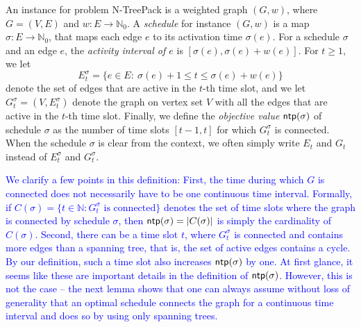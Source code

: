 \documentclass[runningheads]{llncs}
\newcommand{\NN}{\mathbb{N}}
\newcommand{\set}[1]{\{ #1 \}}
\newcommand{\xxxNTP}{{\sc N-TreePack}}
\DeclareMathOperator{\ntp}{\text{\sf ntp}}
\newcommand{\lasse}[1]{\textcolor{blue}{#1}}
\begin{document}
An instance for problem {\xxxNTP} is a weighted graph $(G,w)$, where $G=(V,E)$ and $w:E\to\NN_0$. 
A \emph{schedule} for instance $(G,w)$ is a map $\sigma:E\to\NN_0$, that maps each edge $e$ to 
its activation time $\sigma(e)$.
For a schedule $\sigma$ and an edge $e$, the \emph{activity interval of $e$} is $[\sigma(e),\sigma(e)+w(e)]$. 
For $t\ge1$, we let 
\[E^\sigma_t= \set{e\in E:~ \sigma(e)+1 \le t \le \sigma(e)+w(e)}\]
 denote 
the set of edges that are active in the $t$-th time slot, and we let $G^\sigma_t=(V,E^\sigma_t)$ 
denote the graph on vertex set $V$ with all the edges that are active in the $t$-th time slot. 
Finally, we define the \emph{objective value} $\ntp(\sigma)$ of schedule $\sigma$ as the number of time 
slots $[t-1,t]$ for which $G^\sigma_t$ is connected. When the schedule $\sigma$ is clear from the context, we often simply write $E_t$ and $G_t$ instead of 
$E^\sigma_t$ and $G^\sigma_t$. 

 \lasse{We clarify a few points in this definition: 
First, the time during which $G$ is connected does not necessarily have to be one continuous time interval. Formally, if $C(\sigma) = \set{t \in \NN : G^\sigma_t \text{ is connected}}$ denotes the set of time slots where the graph is connected by schedule $\sigma$, then $\ntp(\sigma) = |C(\sigma)|$ is simply the cardinality of $C(\sigma)$. 
Second, there can be a time slot $t$, where $G^\sigma_t$ is connected and contains more edges than a spanning tree, that is, the set of active edges contains a cycle. 
By our definition, such a time slot also increases $\ntp(\sigma)$ by one. 
At first glance, it seems like these are important details in the definition of $\ntp(\sigma)$. 
However, this is not the case -- the next lemma shows that one can always assume without loss of generality that an optimal schedule connects the graph for a continuous time interval and does so by using only spanning trees. }



\end{document}

